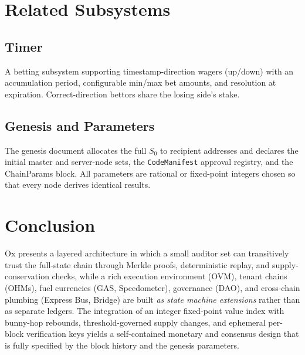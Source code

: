 \documentclass[11pt,a4paper]{article}
\theoremstyle{definition}
\newcommand{\ox}{\textsf{Ox}}
\newcommand{\gas}{\textsf{GAS}}
\newcommand{\ovm}{\textsf{OVM}}
\newcommand{\ohms}{OHMs}
\newcommand{\ChainParams}{\textsf{ChainParams}}
\begin{document}
\section{Related Subsystems}

\subsection{Timer}
A betting subsystem supporting timestamp-direction wagers (up/down) with an
accumulation period, configurable min/max bet amounts, and resolution at
expiration.  Correct-direction bettors share the losing side's stake.

\subsection{Genesis and Parameters}
The genesis document allocates the full $S_0$ to recipient addresses and
declares the initial master and server-node sets, the \texttt{CodeManifest}
approval registry, and the \ChainParams{} block.  All parameters are rational
or fixed-point integers chosen so that every node derives identical results.

\section{Conclusion}

\ox{} presents a layered architecture in which a small auditor set can
transitively trust the full-state chain through Merkle proofs, deterministic
replay, and supply-conservation checks, while a rich execution environment
(\ovm{}), tenant chains (\ohms{}), fuel currencies (\gas{}, Speedometer),
governance (DAO), and cross-chain plumbing (Express Bus, Bridge) are built
\emph{as state machine extensions} rather than as separate ledgers.  The
integration of an integer fixed-point value index with bunny-hop rebounds,
threshold-governed supply changes, and ephemeral per-block verification keys
yields a self-contained monetary and consensus design that is fully specified
by the block history and the genesis parameters.



\end{document}
